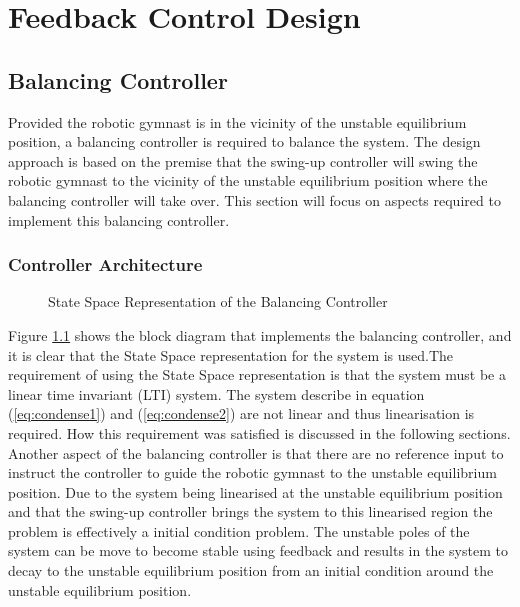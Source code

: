 \chapter{Feedback Control Design}
\label{chp:controller}

\section{Balancing Controller}

Provided the robotic gymnast is in the vicinity of the unstable equilibrium position, a balancing controller is required to balance the system. The design approach is based on the premise that the swing-up controller will swing the robotic gymnast to the vicinity of the unstable equilibrium position where the balancing controller will take over. This section will focus on aspects required to implement this balancing controller.\\


\subsection{Controller Architecture}

\begin{figure}
	\centering
	
	\caption{State Space Representation of the Balancing Controller}
	\label{fig:linearSys2}
\end{figure}

Figure \ref{fig:linearSys2} shows the block diagram that implements the balancing controller, and it is clear that the State Space representation for the system is used.The requirement of using the State Space representation is that the system must be a linear time invariant (LTI) system. The system describe in equation (\ref{eq:condense1}) and (\ref{eq:condense2}) are not linear and thus linearisation is required. How this requirement was satisfied is discussed in the following sections.\\

Another aspect of the balancing controller is that there are no reference input to instruct the controller to guide the robotic gymnast to the unstable equilibrium position. Due to the system being linearised at the unstable equilibrium position and that the swing-up controller brings the system to this linearised region the problem is effectively a initial condition problem. The unstable poles of the system can be move to become stable using feedback and results in the system to decay to the unstable equilibrium position from an initial condition around the unstable equilibrium position.


